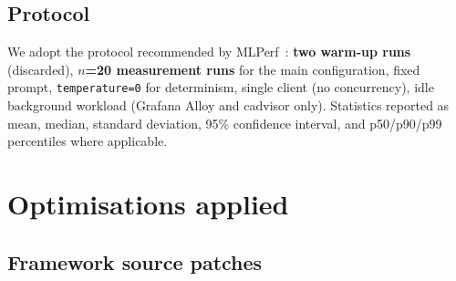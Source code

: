 \documentclass[10pt,a4paper]{article}
\begin{document}
\subsection{Protocol}

We adopt the protocol recommended by MLPerf~\cite{mlperf2025}: \textbf{two warm-up runs} (discarded), \textbf{$n$=20 measurement runs} for the main configuration, fixed prompt, \texttt{temperature=0} for determinism, single client (no concurrency), idle background workload (Grafana Alloy and cadvisor only). Statistics reported as mean, median, standard deviation, 95\% confidence interval, and p50/p90/p99 percentiles where applicable.

\section{Optimisations applied}
\label{sec:patches}

\subsection{Framework source patches}
\end{document}
